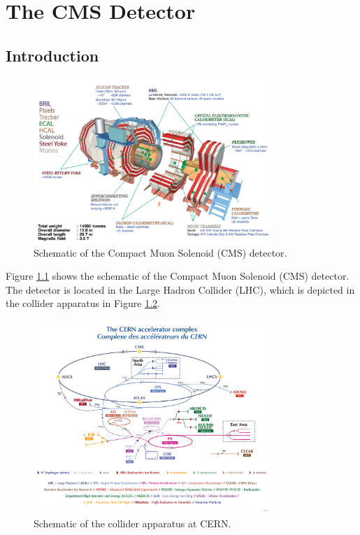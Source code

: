 \chapter{The CMS Detector}\label{chap:cms}


\section{Introduction}\label{sec:ch3:intro}

 \begin{figure}[h]
\centering
\includegraphics[width=0.8\textwidth]{figures/cms_schematic.png}
\caption{Schematic of the Compact Muon Solenoid (CMS) detector.}
\label{fig:cms}
\end{figure}

Figure \ref{fig:cms} shows the schematic of the Compact Muon Solenoid (CMS) detector. The detector is located in the Large Hadron Collider (LHC), which is depicted in the collider apparatus in Figure \ref{fig:cern}.

 \begin{figure}[h]
\centering
\includegraphics[width=0.8\textwidth]{figures/CCC-v2022.png}
\caption{Schematic of the collider apparatus at CERN.}
\label{fig:cern}
\end{figure}


